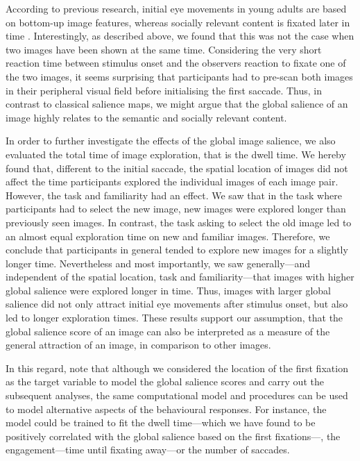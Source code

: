 {According to previous research, initial eye movements in young adults are based on bottom-up image features, whereas socially relevant content is fixated later in time \citep{acik2010bottomuptopdown}. Interestingly, as described above, we found that this was not the case when two images have been shown at the same time. Considering the very short reaction time between stimulus onset and the observers reaction to fixate one of the two images, it seems surprising that participants had to pre-scan both images in their peripheral visual field before initialising the first saccade. Thus, in contrast to classical salience maps, we might argue that the global salience of an image highly relates to the semantic and socially relevant content.

In order to further investigate the effects of the global image salience, we also evaluated the total time of image exploration, that is the dwell time. We hereby found that, different to the initial saccade, the spatial location of images did not affect the time participants explored the individual images of each image pair. However, the task and familiarity had an effect. We saw that in the task where participants had to select the new image, new images were explored longer than previously seen images. In contrast, the task asking to select the old image led to an almost equal exploration time on new and familiar images. Therefore, we conclude that participants in general tended to explore new images for a slightly longer time. Nevertheless and most importantly, we saw generally---and independent of the spatial location, task and familiarity---that images with higher global salience were explored longer in time. Thus, images with larger global salience did not only attract initial eye movements after stimulus onset, but also led to longer exploration times. These results support our assumption, that the global salience score of an image can also be interpreted as a measure of the general attraction of an image, in comparison to other images. 

In this regard, note that although we considered the location of the first fixation as the target variable to model the global salience scores and carry out the subsequent analyses, the same computational model and procedures can be used to model alternative aspects of the behavioural responses. For instance, the model could be trained to fit the dwell time---which we have found to be positively correlated with the global salience based on the first fixations---, the engagement---time until fixating away---or the number of saccades.

}
